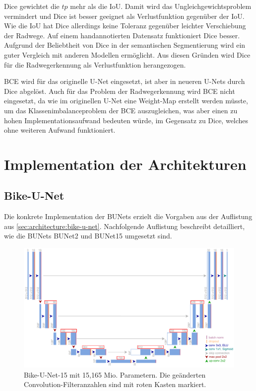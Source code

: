 Dice gewichtet die $tp$ mehr als die \ac{IoU}. Damit wird das Ungleichgewichtsproblem vermindert und Dice ist 
besser geeignet als Verlustfunktion gegenüber der \ac{IoU}. Wie die \ac{IoU} hat Dice allerdings keine Toleranz 
gegenüber leichter Verschiebung der Radwege. Auf einem handannotierten Datensatz funktioniert Dice besser. 
Aufgrund der Beliebtheit von Dice in der semantischen Segmentierung 
wird ein guter Vergleich mit anderen Modellen ermöglicht. 
Aus diesen Gründen wird Dice für die Radwegerkennung als Verlustfunktion herangezogen.

\acf{BCE} wird für das originelle U-Net eingesetzt, ist aber in neueren U-Nets durch Dice abgelöst. 
Auch für das Problem der Radwegerkennung wird BCE nicht eingesetzt, da wie im originellen U-Net eine Weight-Map erstellt werden müsste, 
um das Klassenimbalanceproblem der BCE auszugleichen, was aber einen zu hohen Implementationsaufwand bedeuten würde, im Gegensatz zu 
Dice, welches ohne weiteren Aufwand funktioniert. 

\section{Implementation der Architekturen} \label{sec:arch-impl}

\subsection{Bike-U-Net} \label{sec:arch-impl:bunet}

Die konkrete Implementation der \acp{BUNet} erzielt die Vorgaben aus der Auflistung aus \autoref{sec:architecture:bike-u-net}. 
Nachfolgende Auflistung beschreibt detailliert, wie die \acp{BUNet} \ac{BUNet2} und \ac{BUNet15} umgesetzt sind.  

\begin{figure}
	\centering
	\includegraphics[width=1.\textwidth]{Bilder/own-unet-15mil-marked.pdf} 
	\caption{Bike-U-Net-15 mit 15,165 Mio. Parametern. Die geänderten Convolution-Filteranzahlen sind mit roten Kasten markiert.}
	\label{fig:bike-unet-15}
\end{figure} 

